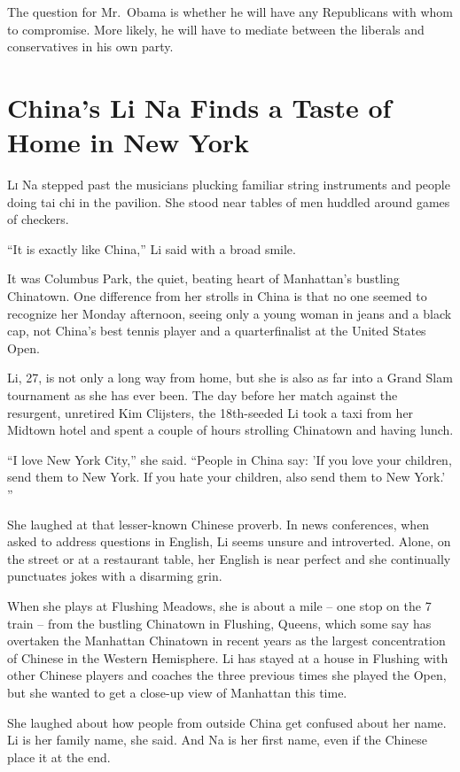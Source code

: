 ﻿\documentclass[12pt]{article}
\begin{document}
The question for Mr.~Obama is whether he will have any Republicans with whom to compromise. More
likely, he will have to mediate between the liberals and conservatives in his own party.

\section{China's Li Na Finds a Taste of Home in New York}

\lettrine{L}{i} Na stepped past the musicians plucking familiar string instruments and people doing
tai chi in the pavilion. She stood near tables of men huddled around games of checkers.

``It is exactly like China,'' Li said with a broad smile.

It was Columbus Park, the quiet, beating heart of Manhattan's bustling Chinatown. One difference
from her strolls in China is that no one seemed to recognize her Monday afternoon, seeing only a
young woman in jeans and a black cap, not China's best tennis player and a quarterfinalist at the
United States Open.

Li, 27, is not only a long way from home, but she is also as far into a Grand Slam tournament as she
has ever been. The day before her match against the resurgent, unretired Kim Clijsters, the
18th-seeded Li took a taxi from her Midtown hotel and spent a couple of hours strolling Chinatown
and having lunch.

``I love New York City,'' she said. ``People in China say: 'If you love your children, send them to
New York. If you hate your children, also send them to New York.' ''

She laughed at that lesser-known Chinese proverb\cite{proverb}. In news conferences, when asked to
address questions in English, Li seems unsure and introverted. Alone, on the street or at a
restaurant table, her English is near perfect and she continually punctuates jokes with a disarming
grin.

When she plays at Flushing Meadows, she is about a mile -- one stop on the 7 train -- from the
bustling Chinatown in Flushing, Queens, which some say has overtaken the Manhattan Chinatown in
recent years as the largest concentration of Chinese in the Western Hemisphere. Li has stayed at a
house in Flushing with other Chinese players and coaches the three previous times she played the
Open, but she wanted to get a close-up view of Manhattan this time.

She laughed about how people from outside China get confused about her name. Li is her family name,
she said. And Na is her first name, even if the Chinese place it at the end.
\end{document}
